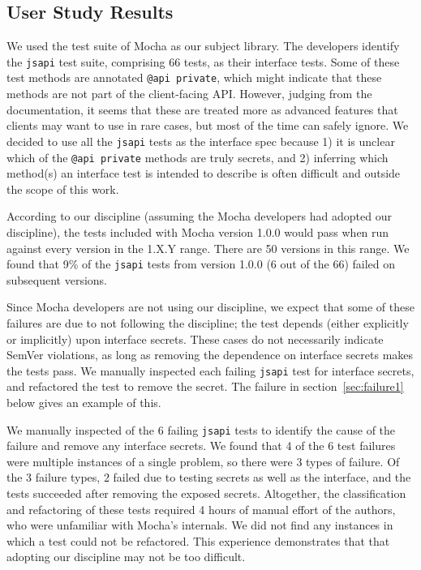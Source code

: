 \subsection{User Study Results}
We used the test suite of Mocha as our subject library. The developers
identify the {\tt jsapi} test suite, comprising 66 tests, as their
interface tests. Some of these test methods are annotated
{\tt @api private}, which might indicate that these methods are not
part of the client-facing API\@. However, judging from the
documentation, it seems that these are treated more as advanced
features that clients may want to use in rare cases, but most of the
time can safely ignore. We decided to use all the {\tt jsapi} tests as the
interface spec because 1) it is unclear which of the {\tt @api
  private} methods are truly secrets, and 2) inferring which
method(s) an interface test is intended to describe is often difficult and
outside the scope of this work.

According to our discipline (assuming the Mocha developers had adopted
our discipline), the tests included with Mocha version 1.0.0 would
pass when run against every version in the 1.X.Y range. There are 50
versions in this range. We found that 9\% of the {\tt jsapi} tests from
version 1.0.0 (6 out of the 66) failed on subsequent versions.

Since Mocha developers are not using our discipline, we expect that some of
these failures are due to not following the discipline; the test
depends (either explicitly or implicitly) upon interface secrets. These
cases do not necessarily indicate SemVer violations, as long as
removing the dependence on interface secrets makes the tests pass. We
manually inspected each failing {\tt jsapi} test for interface secrets, and
refactored the test to remove the secret. The failure in
section~\ref{sec:failure1} below gives an example of this.

We manually inspected of the 6 failing {\tt jsapi} tests to identify the
cause of the failure and remove any interface secrets. We found that 4 of
the 6 test failures were multiple instances of a single problem, so
there were 3 types of failure. Of the 3 failure types, 2 failed due to
testing secrets as well as the interface, and the tests succeeded after
removing the exposed secrets. Altogether, the classification and
refactoring of these tests required 4 hours of manual effort of the
authors, who were unfamiliar with Mocha's internals. We did not find any
instances in which a test could not be refactored. This experience
demonstrates that that adopting our discipline may not be too difficult.

